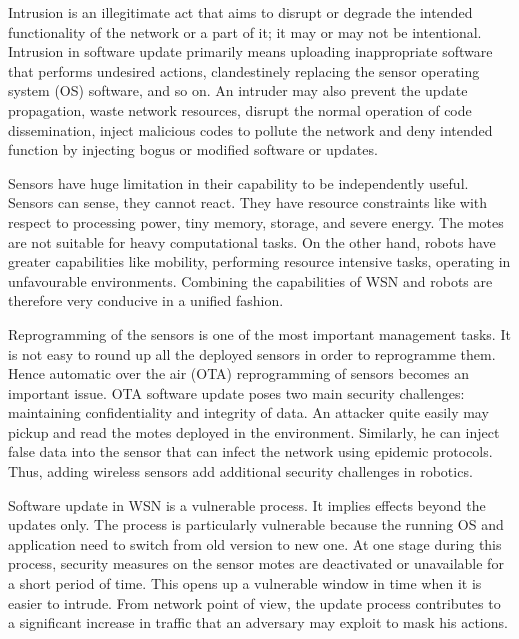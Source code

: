 \documentclass[conference,manuscript]{IEEEtran}
\begin{document}
Intrusion is an illegitimate act that aims to disrupt or degrade the intended functionality of the network or a part of it; it  may or may not be intentional.
Intrusion in software update primarily means uploading inappropriate software that performs undesired actions, clandestinely replacing the  sensor operating system (OS) software, and so on.
An intruder may also prevent the update propagation, waste network resources, disrupt the normal operation of code dissemination, inject malicious codes to pollute the network and deny intended function by  injecting bogus or modified software or updates. 


Sensors have huge limitation in their capability to be independently useful.
Sensors can sense, they cannot react. 
They have resource constraints like with respect to processing power, tiny memory, storage, and severe energy.
The motes are not suitable for heavy computational tasks.
On the other hand, robots have greater capabilities like mobility, performing resource intensive tasks, operating in unfavourable environments.
Combining the capabilities of WSN and robots are therefore very conducive in a unified fashion.


Reprogramming of the sensors is one of the most important management tasks.
It is not easy to round up all the deployed sensors in order to reprogramme them. 
Hence automatic over the air (OTA) reprogramming of sensors becomes an important issue.
OTA software update poses two main security challenges: maintaining confidentiality and integrity of data. 
An attacker quite easily may pickup and read the motes deployed in the environment.
Similarly, he can inject false data into the sensor that can infect the network using epidemic protocols. 
Thus, adding wireless sensors add additional security challenges in robotics.



Software update in WSN is a vulnerable process.
It implies effects beyond the updates only.
The process is particularly vulnerable because the running OS and application need to switch from old version to new one. 
At one stage during this process, security  measures on the sensor motes are deactivated or unavailable for a short period of time.
This opens up a vulnerable window in time when it is easier to intrude.
From network point of view, the update process contributes to a significant increase in traffic that an adversary may exploit to  mask his actions. 
\end{document}
